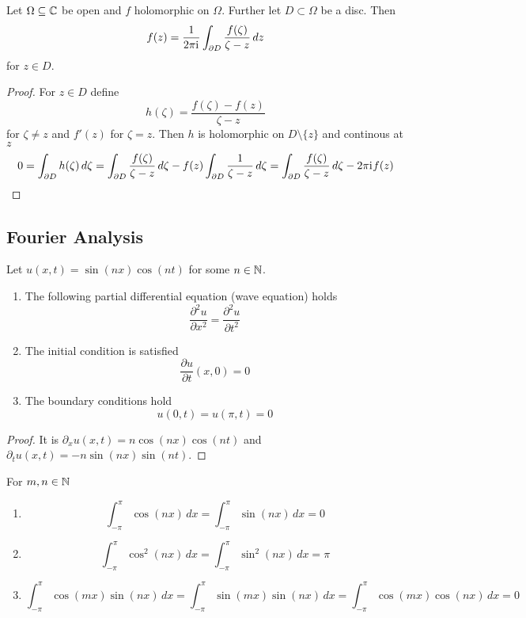 \begin{theorem}
	Let \( \Omega \subseteq \mathbb{C} \) be open and \( f \) holomorphic on \( \Omega \). Further let \( D \subset \Omega \)
	be a disc. Then
	\[
		f(z) = \frac{1}{2\pi\iu} \int_{\boundary D} \frac{f(\zeta)}{\zeta - z}\,dz%
	\]
	for \( z \in D \).
\end{theorem}

\begin{proof}
	For \( z \in D \) define
	\[
		h(\zeta) = \frac{f(\zeta)- f(z)}{\zeta - z} %
	\]
	for \( \zeta \ne z \) and \( f'(z)  \) for \( \zeta = z \). Then \( h \) is holomorphic on \( D \setminus \{ z \} \) and
	continous at \( z \)
	\[
		0 = \int_{\partial D} h(\zeta) \,d\zeta
		= \int_{\partial D} \frac{f(\zeta)}{\zeta - z}\,d\zeta - f(z)\int_{\partial D} \frac{1}{\zeta - z}\,d\zeta
		= \int_{\partial D} \frac{f(\zeta)}{\zeta - z}\,d\zeta - 2\pi\mathrm{i}\mkern1mu f(z)
	\]
\end{proof}
\bigskip


\subsection{Fourier Analysis}
\bigskip

\begin{lemma}
	Let \( u(x, t) = \sin(nx) \cos(nt) \) for some \( n \in \mathbb{N} \).
	\begin{enumerate}
		\item The following partial differential equation (wave equation) holds
		      \[
			      \frac{\partial^2 u}{\partial x^2} = \frac{\partial^2 u}{\partial t^2}
		      \]
		\item The initial condition is satisfied
		      \[
			      \frac{\partial u}{\partial t}(x, 0) = 0
		      \]
		\item The boundary conditions hold
		      \[ u(0, t) = u(\pi, t) = 0 \]
	\end{enumerate}
\end{lemma}

\begin{proof}
	It is \( \partial_x u(x, t) = n \cos(nx) \cos(nt) \) and \( \partial_t u(x, t) = -n \sin(nx) \sin(nt) \).
\end{proof}
\bigskip


\begin{lemma}
	For \( m, n \in \mathbb{N} \)
	\begin{enumerate}
		\item
		      \[
			      \int_{-\pi}^\pi \cos(nx)\,dx = \int_{-\pi}^\pi \sin(nx)\,dx =  0
		      \]
		\item
		      \[
			      \int_{-\pi}^\pi \cos^2(nx)\,dx = \int_{-\pi}^\pi \sin^2(nx)\,dx = \pi
		      \]
		\item
		      \[
			      \int_{-\pi}^\pi \cos(mx)\sin(nx)\,dx = \int_{-\pi}^\pi \sin(mx) \sin(nx)\,dx
			      = \int_{-\pi}^\pi \cos(mx) \cos(nx)\,dx = 0
		      \]
	\end{enumerate}
\end{lemma}

